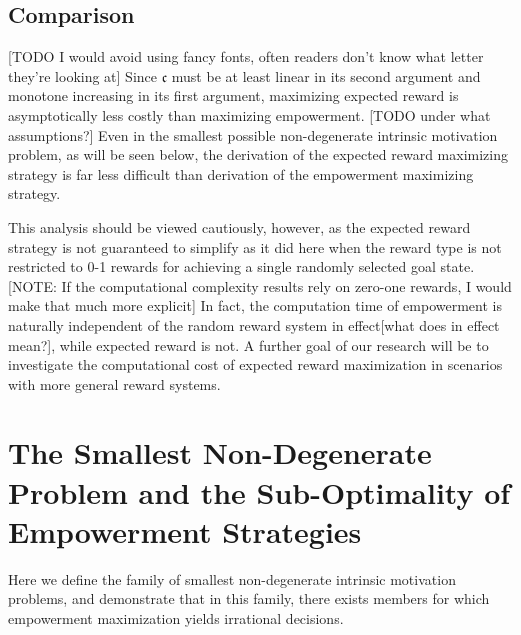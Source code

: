 \documentclass{article}
\begin{document}

\subsection{Comparison}
[TODO I would avoid using fancy fonts, often readers don't know what letter they're looking at]
Since $\mathfrak{c}$ must be at least linear in its second argument and monotone increasing in its first argument, maximizing expected reward is asymptotically less costly than maximizing empowerment. [TODO under what assumptions?]
Even in the smallest possible non-degenerate intrinsic motivation problem, as will be seen below, the derivation of the expected reward maximizing strategy is far less difficult than derivation of the empowerment maximizing strategy. 

This analysis should be viewed cautiously, however, as the expected reward strategy is not guaranteed to simplify as it did here when the reward type is not restricted to 0-1 rewards for achieving a single randomly selected goal state. [NOTE: If the computational complexity results rely on zero-one rewards, I would make that much more explicit]
In fact, the computation time of empowerment is naturally independent of the random reward system in effect[what does in effect mean?], while expected reward is not.
A further goal of our research will be to investigate the computational cost of expected reward maximization in scenarios with more general reward systems.

\section{The Smallest Non-Degenerate Problem and the Sub-Optimality of Empowerment Strategies}
Here we define the family of smallest non-degenerate intrinsic motivation problems, and demonstrate that in this family, there exists members for which empowerment maximization yields irrational decisions.
\end{document}
